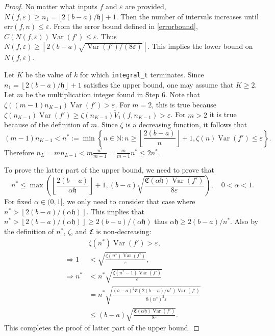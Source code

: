 \documentclass{iitthesis}
\DeclareMathOperator{\Var}{Var}
\theoremstyle{definition}
\theoremstyle{remark}
\begin{document}
\begin{proof}
  No matter what inputs $f$ and $\varepsilon$ are provided, $N(f,\varepsilon)\ge n_1=\lfloor 2(b-a)/\mathfrak{h}\rfloor+1$. Then the number of intervals increases until $\overline{\text{err}}(f,n)\le\varepsilon$. From the error bound defined in \eqref{errorbound}, $C(N(f,\varepsilon))\Var(f')\leq \varepsilon$. Thus $N(f,\varepsilon)\geq \left\lceil2(b-a)\sqrt{\Var(f')/(8\varepsilon)}\right\rceil$. This implies the lower bound on $N(f,\varepsilon)$.

  Let $K$ be the value of $k$ for which {\tt integral\_t} terminates. Since $n_1=\left\lfloor2(b-a)/\mathfrak{h}\right\rfloor+1$ satisfies the upper bound, one may assume that $K \ge 2$. Let $m$ be the multiplication integer found in Step 6. Note that $\zeta((m-1)n_{K-1})\Var(f')>\varepsilon$. For $m=2$, this is true because $\zeta(n_{K-1})\Var(f')\ge\zeta(n_{K-1})\widetilde{V}_{1}(f,n_{K-1})>\varepsilon$. For $m>2$ it is true because of the definition of $m$. Since $\zeta$ is a decreasing function, it follows that
  $$(m-1)n_{K-1}<n^*:=\min\left\{n\in\mathbb{N}:n\ge\left\lfloor\frac{2(b-a)}{n}\right\rfloor+1,\zeta(n)\Var(f')\le\varepsilon\right\}.$$
  Therefore $n_L=mn_{L-1}<m\frac{n^*}{m-1}=\frac{m}{m-1}n^*\le2n^*$.

  To prove the latter part of the upper bound, we need to prove that
  $$n^*\leq\max\left(\left\lfloor\frac{2(b-a)}{\alpha\mathfrak{h}}\right\rfloor+1,(b-a)\sqrt{\frac{\mathfrak{C}(\alpha\mathfrak{h})\Var(f')}{8\varepsilon}}\right),\quad 0<\alpha<1.$$
  For fixed $\alpha\in(0,1]$, we only need to consider that case where $n^*>\left\lfloor2(b-a)/(\alpha\mathfrak{h})\right\rfloor$. This implies that $n^*>\left\lfloor2(b-a)/(\alpha\mathfrak{h})\right\rfloor\ge 2(b-a)/(\alpha\mathfrak{h})$ thus $\alpha\mathfrak{h}\ge2(b-a)/n^*$. Also by the definition of $n^*$, $\zeta$, and $\mathfrak{C}$ is non-decreasing:
  \begin{align*}
    &\zeta(n^*)\Var(f')>\varepsilon, \\
    \Rightarrow 1&<\sqrt{\frac{\zeta(n^*)\Var(f')}{\varepsilon}},\\
    \Rightarrow n^*&<n^*\sqrt{\frac{\zeta(n^*-1)\Var(f')}{\varepsilon}}\\
    &=n^*\sqrt{\frac{(b-a)^2\mathfrak{C}(2(b-a)/n^*)\Var(f')}{8(n^*)^2\varepsilon}}\\
    &\le(b-a)\sqrt{\frac{\mathfrak{C}(\alpha\mathfrak{h})\Var(f')}{8\varepsilon}}.
  \end{align*}
  This completes the proof of latter part of the upper bound.
\end{proof}
\end{document}
